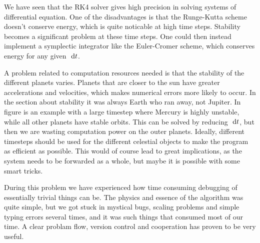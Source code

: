 We have seen that the RK4 solver gives high precision in solving systems of
differential equation. One of the disadvantages is that the Runge-Kutta scheme
doesn't conserve energy, which is quite noticable at high time steps. Stability
becomes a significant problem at these time steps. One could
then instead implement a symplectic integrator like the Euler-Cromer scheme,
which conserves energy for any given $\ \mathrm{d}t$.

A problem related to computation resources needed is that the stability of the different planets varies. Planets that are closer to the sun have greater accelerations and velocities, which makes numerical errors more likely to occur. In the section about stability it was always Earth who ran away, not Jupiter. In figure  is an example with a large timestep where Mercury is highly unstable, while all other planets have stable orbits. This can be solved by reducing $\ \mathrm{d}t$, but then we are wasting computation power on the outer planets. Ideally, different timesteps should be used for the different celestial objects to make the program as efficient as possible. This would of course lead to great implications, as the system needs to be forwarded as a whole, but maybe it is possible with some smart tricks.

During this problem we have experienced how time consuming debugging of essentially trivial things can be. The physics and essence of the algorithm was quite simple, but we got stuck in mystical bugs, scaling problems and simple typing errors several times, and it was such things that consumed most of our time. A clear problam flow, version control and cooperation has proven to be very useful.

